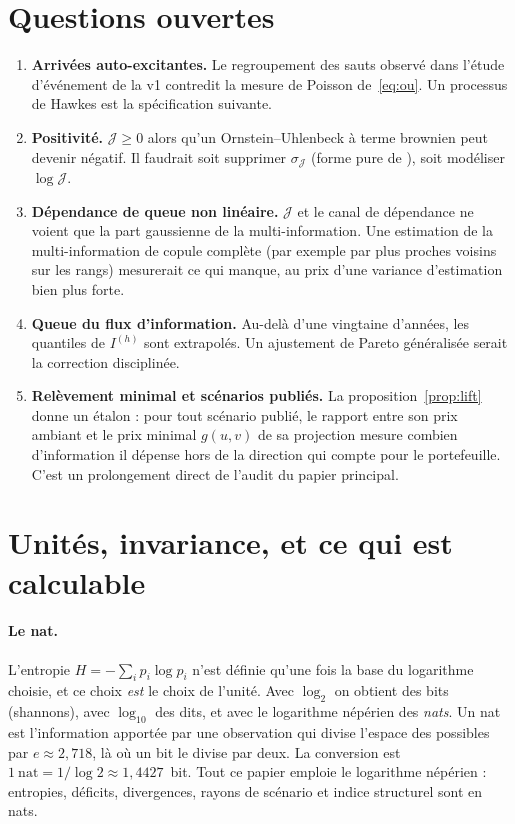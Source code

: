 \documentclass[11pt]{article}
\theoremstyle{definition}
\theoremstyle{remark}
\newcommand{\JJ}{\mathcal{J}}
\begin{document}
\section{Questions ouvertes}
\label{sec:open}

\begin{enumerate}
\item \textbf{Arrivées auto-excitantes.} Le regroupement des sauts observé dans
l'étude d'événement de la v1 contredit la mesure de Poisson de~\eqref{eq:ou}.
Un processus de Hawkes est la spécification suivante.
\item \textbf{Positivité.} $\JJ\ge0$ alors qu'un Ornstein--Uhlenbeck à terme
brownien peut devenir négatif. Il faudrait soit supprimer $\sigma_\JJ$ (forme
pure de \citealt{bns2001}), soit modéliser $\log\JJ$.
\item \textbf{Dépendance de queue non linéaire.} $\JJ$ et le canal de dépendance
ne voient que la part gaussienne de la multi-information. Une estimation de la
multi-information de copule complète (par exemple par plus proches voisins sur
les rangs) mesurerait ce qui manque, au prix d'une variance d'estimation bien
plus forte.
\item \textbf{Queue du flux d'information.} Au-delà d'une vingtaine d'années,
les quantiles de $I^{(h)}$ sont extrapolés. Un ajustement de Pareto généralisée
serait la correction disciplinée.
\item \textbf{Relèvement minimal et scénarios publiés.} La
proposition~\ref{prop:lift} donne un étalon : pour tout scénario publié, le
rapport entre son prix ambiant et le prix minimal $g(u,v)$ de sa projection
mesure combien d'information il dépense hors de la direction qui compte pour le
portefeuille. C'est un prolongement direct de l'audit du papier principal.
\end{enumerate}
\appendix

\section{Unités, invariance, et ce qui est calculable}
\label{app:units}

\paragraph{Le nat.} L'entropie $H=-\sum_i p_i\log p_i$ n'est définie qu'une fois
la base du logarithme choisie, et ce choix \emph{est} le choix de l'unité. Avec
$\log_2$ on obtient des bits (shannons), avec $\log_{10}$ des dits, et avec le
logarithme népérien des \emph{nats}. Un nat est l'information apportée par une
observation qui divise l'espace des possibles par $e\approx2{,}718$, là où un bit
le divise par deux. La conversion est
$1~\text{nat}=1/\log 2\approx1{,}4427$~bit. Tout ce papier emploie le logarithme
népérien : entropies, déficits, divergences, rayons de scénario et indice
structurel sont en nats.
\end{document}
